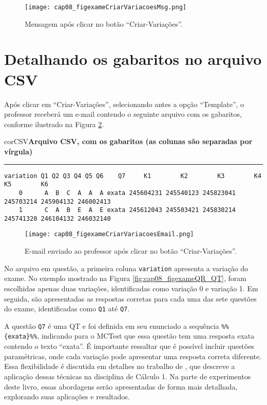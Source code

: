 \begin{figure}[!ht]
  \centering
  \texttt{[image: cap08\_figexameCriarVariacoesMsg.png]}
   \caption{Mensagem após clicar no botão ``Criar-Variações''.}
\label{fig:cap08_figexameCriarVariacoesMsg}
\end{figure}


\section{Detalhando os gabaritos no arquivo CSV}\label{sec:QMgabarito}

Após clicar em ``Criar-Variações'', selecionando antes a opção ``Template'', o professor receberá um e-mail contendo o seguinte arquivo com os gabaritos, conforme ilustrado na Figura \ref{fig:cap08_figexameCriarVariacoesEmail}.

\begin{myboxCode}{corCSV}{\textbf{Arquivo CSV, com os gabaritos (as colunas são separadas por vírgula)}}\vspace{3mm}
\hrule
{\footnotesize
\begin{verbatim}
variation Q1 Q2 Q3 Q4 Q5 Q6    Q7     K1        K2        K3        K4        K5        K6
    0      A  B  C  A  A  A exata 245604231 245540123 245823041 245703214 245904132 246002413
    1      C  A  B  E  A  E exata 245612043 245503421 245830214 245741320 246104132 246032140
\end{verbatim}
}
\end{myboxCode}

\begin{figure}[!ht]
  \centering
  \texttt{[image: cap08\_figexameCriarVariacoesEmail.png]}
   \caption{E-mail enviado ao professor após clicar no botão ``Criar-Variações''.}
\label{fig:cap08_figexameCriarVariacoesEmail}
\end{figure}


No arquivo em questão, a primeira coluna \verb|variation| apresenta a variação do exame. No exemplo mostrado na Figura \ref{fig:cap08_figexameQR_QT}, foram escolhidas apenas duas variações, identificadas como variação 0 e variação 1. Em seguida, são apresentadas as respostas corretas para cada uma das sete questões do exame, identificadas como \verb|Q1| até \verb|Q7|.

A questão \verb|Q7| é uma QT e foi definida em seu enunciado a sequência \verb|%%{exata}%%|, indicando para o MCTest que essa questão tem uma resposta exata contendo o texto ``exata''. É importante ressaltar que é possível incluir questões paramétricas, onde cada variação pode apresentar uma resposta correta diferente. Essa flexibilidade é discutida em detalhes no trabalho de , que descreve a aplicação dessas técnicas na disciplina de Cálculo 1. Na parte de experimentos deste livro, essas abordagens serão apresentadas de forma mais detalhada, explorando suas aplicações e resultados.

